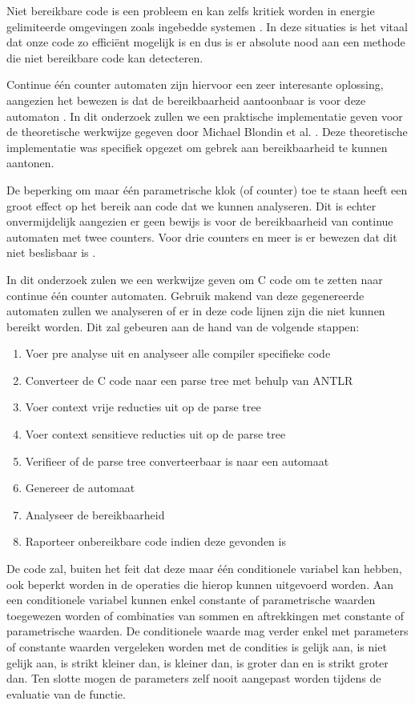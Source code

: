 \documentclass[12pt]{article}
\begin{document}
Niet bereikbare code is een probleem en kan zelfs kritiek worden in energie gelimiteerde omgevingen zoals ingebedde systemen \cite{embeddedefficiency}. In deze situaties is het vitaal dat onze code zo efficiënt mogelijk is en dus is er absolute nood aan een methode die niet bereikbare code kan detecteren.

Continue één counter automaten zijn hiervoor een zeer interesante oplossing, aangezien het bewezen is dat de bereikbaarheid aantoonbaar is voor deze automaton \cite{succintandparametriconecounter, danialandjoel, blondin2021continuous}. In dit onderzoek zullen we een praktische implementatie geven voor de theoretische werkwijze gegeven door Michael Blondin et al. \cite{blondin2021continuous}. Deze theoretische implementatie was specifiek opgezet om gebrek aan bereikbaarheid te kunnen aantonen.

De beperking om maar één parametrische klok (of counter) toe te staan heeft een groot effect op het bereik aan code dat we kunnen analyseren. Dit is echter onvermijdelijk aangezien er geen bewijs is voor de bereikbaarheid van continue automaten met twee counters. Voor drie counters en meer is er bewezen dat dit niet beslisbaar is \cite{FEARNLEY201526}.

In dit onderzoek zulen we een werkwijze geven om C code om te zetten naar continue één counter automaten. Gebruik makend van deze gegenereerde automaten zullen we analyseren of er in deze code lijnen zijn die niet kunnen bereikt worden. Dit zal gebeuren aan de hand van de volgende stappen:

\begin{enumerate}
	\item Voer pre analyse uit en analyseer alle compiler specifieke code
	\item Converteer de C code naar een parse tree met behulp van ANTLR
	\item Voer context vrije reducties uit op de parse tree
	\item Voer context sensitieve reducties uit op de parse tree
	\item Verifieer of de parse tree converteerbaar is naar een automaat
	\item Genereer de automaat
	\item Analyseer de bereikbaarheid
	\item Raporteer onbereikbare code indien deze gevonden is
\end{enumerate}

De code zal, buiten het feit dat deze maar één conditionele variabel kan hebben, ook beperkt worden in de operaties die hierop kunnen uitgevoerd worden. Aan een conditionele variabel kunnen enkel constante of parametrische waarden toegewezen worden of combinaties van sommen en aftrekkingen met constante of parametrische waarden. De conditionele waarde mag verder enkel met parameters of constante waarden vergeleken worden met de condities is gelijk aan, is niet gelijk aan, is strikt kleiner dan, is kleiner dan, is groter dan en is strikt groter dan. Ten slotte mogen de parameters zelf nooit aangepast worden tijdens de evaluatie van de functie.
\end{document}
